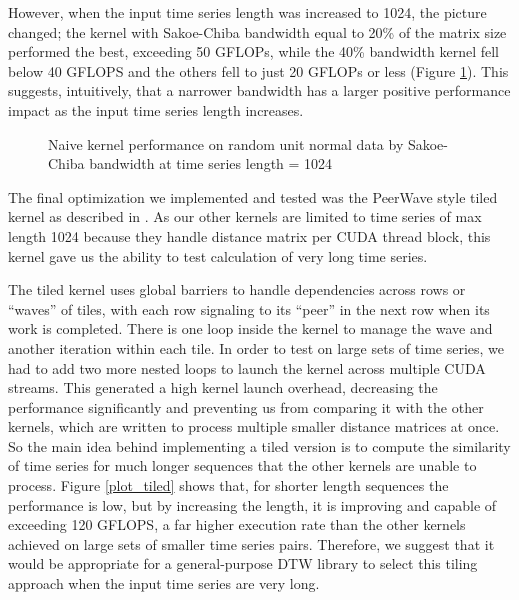 \documentclass[12pt, letterpaper]{article}
\begin{document}
However, when the input time series length was increased to 1024, the picture
changed; the kernel with Sakoe-Chiba bandwidth equal to 20\% of the matrix size
performed the best, exceeding 50 GFLOPs, while the 40\% bandwidth kernel fell
below 40 GFLOPS and the others fell to just 20 GFLOPs or less (Figure
\ref{plot_bw_1024}). This suggests, intuitively, that a narrower bandwidth has a
larger positive performance impact as the input time series length increases.

\begin{figure}[htbp]
    \begin{center}
        \scalebox{0.85}{}
    \end{center}
    \caption{Naive kernel performance on random unit normal data by
      Sakoe-Chiba bandwidth at time series length = 1024}
    \label{plot_bw_1024}
\end{figure}

The final optimization we implemented and tested was the PeerWave style tiled
kernel as described in \cite{belviranli_peerwave_2015}. As our other kernels are
limited to time series of max length 1024 because they handle distance matrix
per CUDA thread block, this kernel gave us the ability to test calculation of
very long time series.

The tiled kernel uses global barriers to handle dependencies across rows or
``waves'' of tiles, with each row signaling to its ``peer'' in the next row when
its work is completed. There is one loop inside the kernel to manage the wave
and another iteration within each tile. In order to test on large sets of time
series, we had to add two more nested loops to launch the kernel across multiple
CUDA streams. This generated a high kernel launch overhead, decreasing the
performance significantly and preventing us from comparing it with the other
kernels, which are written to process multiple smaller distance matrices at
once. So the main idea behind implementing a tiled version is to compute the
similarity of time series for much longer sequences that the other kernels are
unable to process. Figure \ref{plot_tiled} shows that, for shorter length
sequences the performance is low, but by increasing the length, it is improving
and capable of exceeding 120 GFLOPS, a far higher execution rate than the other
kernels achieved on large sets of smaller time series pairs. Therefore, we
suggest that it would be appropriate for a general-purpose DTW library to select
this tiling approach when the input time series are very long.
\end{document}

